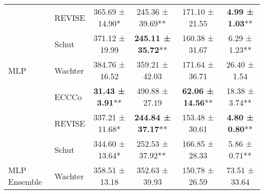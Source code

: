 \begin{table}
{\begin{tabular}[t]{llcccc}
 & REVISE & 365.69 ± 14.90*\hphantom{*} & 245.36 ± 39.69** & 171.10 ± 21.55\hphantom{*}\hphantom{*} & \textbf{4.99 ± 1.03}**\\

 & Schut & 371.12 ± 19.99\hphantom{*}\hphantom{*} & \textbf{245.11 ± 35.72}** & 160.38 ± 31.67\hphantom{*}\hphantom{*} & 6.29 ± 1.23**\\

\multirow{-4}{*}{\raggedright\arraybackslash MLP} & Wachter & 384.76 ± 16.52\hphantom{*}\hphantom{*} & 359.21 ± 42.03\hphantom{*}\hphantom{*} & 171.64 ± 36.71\hphantom{*}\hphantom{*} & 26.40 ± 1.54\hphantom{*}\hphantom{*}\\
\cmidrule{1-6}
 & ECCCo & \textbf{31.43 ± 3.91}** & 490.88 ± 27.19\hphantom{*}\hphantom{*} & \textbf{62.06 ± 14.56}** & 18.38 ± 3.74**\\

 & REVISE & 337.21 ± 11.68*\hphantom{*} & \textbf{244.84 ± 37.17}** & 153.48 ± 30.61\hphantom{*}\hphantom{*} & \textbf{4.80 ± 0.80}**\\

 & Schut & 344.60 ± 13.64*\hphantom{*} & 252.53 ± 37.92** & 166.85 ± 28.33\hphantom{*}\hphantom{*} & 5.86 ± 0.71**\\

\multirow{-4}{*}{\raggedright\arraybackslash MLP Ensemble} & Wachter & 358.51 ± 13.18\hphantom{*}\hphantom{*} & 352.63 ± 39.93\hphantom{*}\hphantom{*} & 150.78 ± 26.59\hphantom{*}\hphantom{*} & 73.51 ± 33.64\hphantom{*}\hphantom{*}\\
\bottomrule
\end{tabular}}
\end{table}
